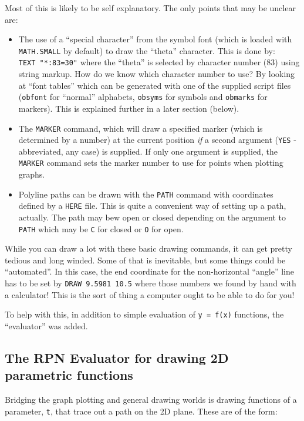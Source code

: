 \documentclass[a4paper,twoside,11pt]{article}
\newcommand{\newpara}{\par\vspace{4mm}\noindent}
\begin{document}
\newpara
Most of this is likely to be self explanatory. The only points that may
be unclear are:

\begin{itemize}
\item
  The use of a ``special character'' from the symbol font (which is
  loaded with \texttt{MATH.SMALL} by default) to draw the ``theta''
  character. This is done by: \texttt{TEXT\ "*:83=30"} where the
  ``theta'' is selected by character number (83) using string markup.
  How do we know which character number to use? By looking at ``font
  tables'' which can be generated with one of the supplied script files
  (\texttt{obfont} for ``normal'' alphabets, \texttt{obsyms} for symbols
  and \texttt{obmarks} for markers). This is explained further in a
  later section (below).
\item
  The \texttt{MARKER} command, which will draw a specified marker (which
  is determined by a number) at the current position \emph{if} a second
  argument (\texttt{YES} - abbreviated, any case) is supplied. If only
  one argument is supplied, the \texttt{MARKER} command sets the marker
  number to use for points when plotting graphs.
\item
  Polyline paths can be drawn with the \texttt{PATH} command with
  coordinates defined by a \texttt{HERE} file. This is quite a
  convenient way of setting up a path, actually. The path may bew open
  or closed depending on the argument to \texttt{PATH} which may be
  \texttt{C} for closed or \texttt{O} for open.
\end{itemize}

\newpara
While you can draw a lot with these basic drawing commands, it can get
pretty tedious and long winded. Some of that is inevitable, but some
things could be ``automated''. In this case, the end coordinate for the
non-horizontal ``angle'' line has to be set by
\texttt{DRAW\ 9.5981\ 10.5} where those numbers we found by hand with a
calculator! This is the sort of thing a computer ought to be able to do
for you!

\newpara
To help with this, in addition to simple evaluation of
\texttt{y\ =\ f(x)} functions, the ``evaluator'' was added.


\subsection{The RPN Evaluator for drawing 2D parametric functions}\label{the-rpn-evaluator-for-drawing-2d-parametric-functions}
\newpara
Bridging the graph plotting and general drawing worlds is drawing
functions of a parameter, \texttt{t}, that trace out a path on the 2D
plane. These are of the form:
\end{document}
